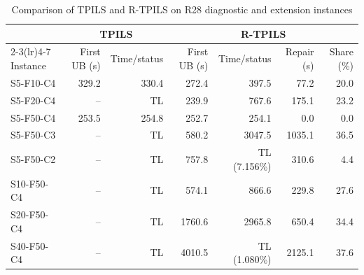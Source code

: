 \begin{table}[!htbp]
\centering
\scriptsize
\setlength{\tabcolsep}{2.5pt}
\caption{Comparison of TPILS and R-TPILS on R28 diagnostic and extension instances}
\label{tab:repair-comparison}
\begin{tabular*}{\linewidth}{@{\extracolsep{\fill}}l rr rr rr@{}}
\toprule
& \multicolumn{2}{c}{TPILS} & \multicolumn{4}{c}{R-TPILS} \\
\cmidrule(lr){2-3}\cmidrule(lr){4-7}
Instance & First UB (s) & Time/status & First UB (s) & Time/status & Repair (s) & Share (\%) \\
\midrule
S5-F10-C4  & 329.2 & 330.4 & 272.4   & 397.5          & 77.2   & 20.0 \\
S5-F20-C4  & --    & TL    & 239.9   & 767.6          & 175.1  & 23.2 \\
S5-F50-C4  & 253.5 & 254.8 & 252.7   & 254.1          & 0.0    & 0.0 \\
S5-F50-C3  & --    & TL    & 580.2   & 3047.5         & 1035.1 & 36.5 \\
S5-F50-C2  & --    & TL    & 757.8   & TL (7.156\%)  & 310.6  & 4.4 \\
S10-F50-C4 & --    & TL    & 574.1   & 866.6          & 229.8  & 27.6 \\
S20-F50-C4 & --    & TL    & 1760.6  & 2965.8         & 650.4  & 34.4 \\
S40-F50-C4 & --    & TL    & 4010.5  & TL (1.080\%)  & 2125.1 & 37.6 \\
\bottomrule
\end{tabular*}
\end{table}

